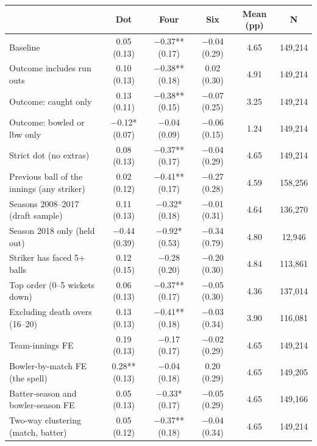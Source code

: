 \begin{tabular}{lccccc}
\toprule
 & Dot & Four & Six & Mean (pp) & N \\
\midrule
Baseline & 0.05 (0.13) & $-$0.37** (0.17) & $-$0.04 (0.29) & 4.65 & 149,214 \\
Outcome includes run outs & 0.10 (0.13) & $-$0.38** (0.18) & 0.02 (0.30) & 4.91 & 149,214 \\
Outcome: caught only & 0.13 (0.11) & $-$0.38** (0.15) & $-$0.07 (0.25) & 3.25 & 149,214 \\
Outcome: bowled or lbw only & $-$0.12* (0.07) & $-$0.04 (0.09) & $-$0.06 (0.15) & 1.24 & 149,214 \\
Strict dot (no extras) & 0.08 (0.13) & $-$0.37** (0.17) & $-$0.04 (0.29) & 4.65 & 149,214 \\
Previous ball of the innings (any striker) & 0.02 (0.12) & $-$0.41** (0.17) & $-$0.27 (0.28) & 4.59 & 158,256 \\
Seasons 2008--2017 (draft sample) & 0.11 (0.13) & $-$0.32* (0.18) & $-$0.01 (0.31) & 4.64 & 136,270 \\
Season 2018 only (held out) & $-$0.44 (0.39) & $-$0.92* (0.53) & $-$0.34 (0.79) & 4.80 & 12,946 \\
Striker has faced 5+ balls & 0.12 (0.15) & $-$0.28 (0.20) & $-$0.20 (0.30) & 4.84 & 113,861 \\
Top order (0--5 wickets down) & 0.06 (0.13) & $-$0.37** (0.17) & $-$0.05 (0.30) & 4.36 & 137,014 \\
Excluding death overs (16--20) & 0.13 (0.13) & $-$0.41** (0.18) & $-$0.03 (0.34) & 3.90 & 116,081 \\
Team-innings FE & 0.19 (0.13) & $-$0.17 (0.17) & $-$0.02 (0.29) & 4.65 & 149,214 \\
Bowler-by-match FE (the spell) & 0.28** (0.13) & $-$0.04 (0.18) & 0.20 (0.29) & 4.65 & 149,205 \\
Batter-season and bowler-season FE & 0.05 (0.13) & $-$0.33* (0.17) & $-$0.05 (0.29) & 4.65 & 149,166 \\
Two-way clustering (match, batter) & 0.05 (0.12) & $-$0.37** (0.18) & $-$0.04 (0.34) & 4.65 & 149,214 \\
\bottomrule
\end{tabular}
